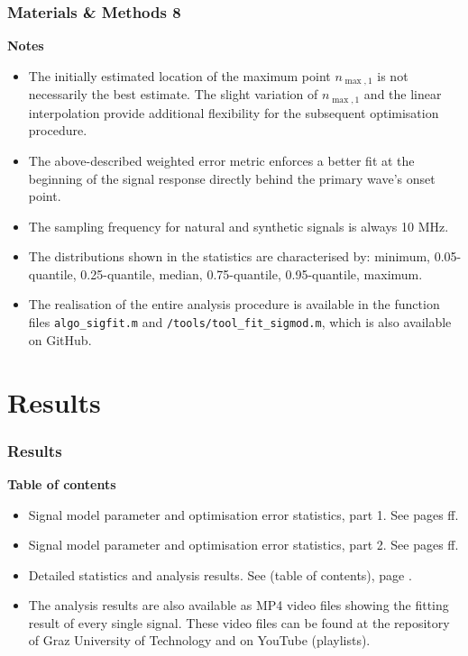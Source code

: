	\begin{frame}
		\frametitle{Materials \& Methods 8}\label{mm:notes}
		\textcolor{RIPtitlecol}{\textbf{Notes}}
		\begin{itemize}
			\item The initially estimated location of the maximum point $n_{\max,1}$ is not necessarily the best estimate. The slight variation of $n_{\max,1}$ and the linear interpolation provide additional flexibility for the subsequent optimisation procedure.
			\item The above-described weighted error metric enforces a better fit at the beginning of the signal response directly behind the primary wave's onset point.
			\item The sampling frequency for natural and synthetic signals is always 10 MHz.
			\item The distributions shown in the statistics are characterised by: minimum, 0.05-quantile, 0.25-quantile, median, 0.75-quantile, 0.95-quantile, maximum.
			\item The realisation of the entire analysis procedure is available in the function files\autocite{code} \texttt{algo\_sigfit.m} and \texttt{\slash{}tools\slash{}tool\_fit\_sigmod.m}, which is also available on GitHub\autocite{repogit}.
		\end{itemize}
	\end{frame}

	\section{Results}
	\begin{frame}
		\frametitle{Results}
		\textcolor{RIPtitlecol}{\textbf{Table of contents}}
		\begin{itemize}
			\item Signal model parameter and optimisation error statistics, part 1. See pages \pageref{res:parerr1}ff.
			\item Signal model parameter and optimisation error statistics, part 2. See pages \pageref{res:parerr2}ff.
			\item Detailed statistics and analysis results. See \appendixname{} (table of contents), page \pageref{app:toc}.
			\item The analysis results are also available as MP4 video files showing the fitting result of every single signal. These video files can be found at the repository\autocite{repovideo} of Graz University of Technology and on YouTube\autocite{ytvideo1,ytvideo2,ytvideo3,ytvideo4,ytvideo5} (playlists).
		\end{itemize}
	\end{frame}

